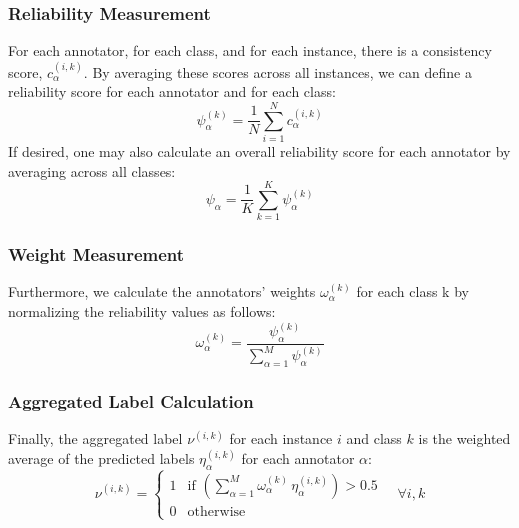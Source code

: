 \subsubsection{Reliability Measurement}
For each annotator, for each class, and for each instance, there is a consistency score, $c_{\alpha}^{(i,k)}$. By averaging these scores across all instances, we can define a reliability score for each annotator and for each class:
\begin{equation}
\psi_{\alpha}^{(k)}=\frac{1}{N}\sum_{i=1}^N c_{\alpha}^{(i,k)}
\end{equation}
If desired, one may also calculate an overall reliability score for each annotator by averaging across all classes:
\begin{equation}
\psi_{\alpha}=\frac{1}{K}\sum_{k=1}^K \psi_{\alpha}^{(k)}
\end{equation}

\subsubsection{Weight Measurement}
Furthermore, we calculate the annotators' weights $\omega_\alpha^{(k)}$ for each class k by normalizing the reliability values as follows:
\begin{equation}
    \omega_{\alpha}^{(k)}=\frac{\psi_{\alpha}^{(k)}}{\sum_{\alpha=1}^{M} \psi_{\alpha}^{(k)}}
    \label{eq:crowd.eq.11.weights}
\end{equation}

\subsubsection{Aggregated Label Calculation}
Finally, the aggregated label $\nu^{(i,k)}$ for each instance $i $ and class $k $ is the weighted average of the predicted labels $\eta_{\alpha}^{(i,k)} $ for each annotator $\alpha $:
\begin{equation}
    \nu^{(i,k)} =
    \begin{cases}
        1 & \text{if } \left(\sum_{\alpha=1}^{M} \omega_{\alpha}^{(k)}\, \eta_{\alpha}^{(i,k)}\right) > 0.5 \\
        0 & \text{otherwise}
    \end{cases}
    \quad \forall i, k
    \label{eq:crowd.Eq.12.aggregated-label}
\end{equation}

